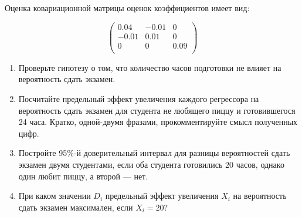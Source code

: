 \documentclass[11pt,russian,]{article}
\begin{document}
Оценка ковариационной матрицы оценок коэффициентов имеет вид:

\[
\begin{pmatrix}
0.04 & -0.01 & 0 \\
-0.01 & 0.01 & 0 \\
0 & 0 & 0.09 \\
\end{pmatrix}
\]

\begin{enumerate}
  \item Проверьте гипотезу о том, что количество часов подготовки не влияет на вероятность сдать экзамен.
  \item Посчитайте предельный эффект увеличения каждого регрессора на вероятность сдать экзамен для студента не любящего пиццу и готовившегося 24 часа.
Кратко, одной-двумя фразами, прокомментируйте смысл полученных цифр.
 \item Постройте 95\%-й доверительный интервал для разницы вероятностей сдать экзамен двумя студентами, если оба студента готовились 20 часов, однако один любит пиццу, а второй — нет.
  \item При каком значении $D_i$ предельный эффект увеличения $X_i$ на вероятность сдать экзамен максимален,
  если $X_i=20$?
\end{enumerate}
\end{document}
